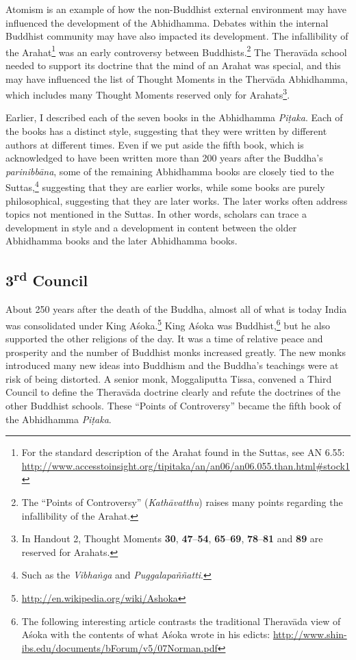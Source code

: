 Atomism is an example of how the non-Buddhist external environment may have influenced the development of the Abhidhamma. Debates within the internal Buddhist community may have also impacted its development. The infallibility of the Arahat\footnote{For the standard description of the Arahat found in the Suttas, see AN 6.55: \url{http://www.accesstoinsight.org/tipitaka/an/an06/an06.055.than.html\#stock1}} was an early controversy between Buddhists.\footnote{The “Points of Controversy” (\textit{Kathāvatthu}) raises many points regarding the infallibility of the Arahat.} The Theravāda school needed to support its doctrine that the mind of an Arahat was special, and this may have influenced the list of Thought Moments in the Thervāda Abhidhamma, which includes many Thought Moments reserved only for Arahats\footnote{In Handout 2, Thought Moments \textbf{30}, \textbf{47}--\textbf{54}, \textbf{65}--\textbf{69}, \textbf{78}--\textbf{81} and \textbf{89} are reserved for Arahats.}.

Earlier, I described each of the seven books in the Abhidhamma \textit{Piṭaka}. Each of the books has a distinct style, suggesting that they were written by different authors at different times. Even if we put aside the fifth book, which is acknowledged to have been written more than 200 years after the Buddha’s \textit{parinibbāna}, some of the remaining Abhidhamma books are closely tied to the Suttas,\footnote{Such as the \textit{Vibhaṅga} and \textit{Puggalapaññatti}.} suggesting that they are earlier works, while some books are purely philosophical, suggesting that they are later works. The later works often address topics not mentioned in the Suttas. In other words, scholars can trace a development in style and a development in content between the older Abhidhamma books and the later Abhidhamma books.

\pagebreak

\subsection*{3\textsuperscript{rd} Council}

About 250 years after the death of the Buddha, almost all of what is today India was consolidated under King Aśoka.\footnote{\url{http://en.wikipedia.org/wiki/Ashoka}} King Aśoka was Buddhist,\footnote{The following interesting article contrasts the traditional Theravāda view of Aśoka with the contents of what Aśoka wrote in his edicts: \url{http://www.shin-ibs.edu/documents/bForum/v5/07Norman.pdf}} but he also supported the other religions of the day. It was a time of relative peace and prosperity and the number of Buddhist monks increased greatly. The new monks introduced many new ideas into Buddhism and the Buddha’s teachings were at risk of being distorted. A senior monk, Moggaliputta Tissa, convened a Third Council to define the Theravāda doctrine clearly and refute the doctrines of the other Buddhist schools. These “Points of Controversy” became the fifth book of the Abhidhamma \textit{Piṭaka}. 

